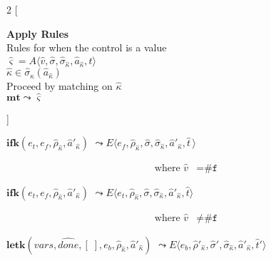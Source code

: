 \documentclass[12pt,draft]{article}
\newcommand{\falsesyn}{\texttt{\#f}}
\begin{document}
\begin{multicols*}{2}
[
\begin{center}
\textbf{Apply Rules} \\
Rules for when the control is a value \\
$\hat{\varsigma} = A\langle \hat{v} , \hat{\sigma} , \hat{\sigma}_{\hat{\kappa}} , \hat{a}_{\hat{\kappa}} , \hat{t} \rangle$ \\
$\hat{\kappa} \in \hat{\sigma}_{\hat{\kappa}}(\hat{a}_{\hat{\kappa}})$ \\
Proceed by matching on $\hat{\kappa}$ \\
\vspace{5mm}
$\textbf{mt} \leadsto \hat{\varsigma}$
\end{center}
\vspace{-5mm}
]
\begin{center}
  $\textbf{ifk}(e_t, e_f, \hat{\rho}_{\hat{\kappa}}, \hat{a}'_{\hat{\kappa}})$
  $\leadsto E\langle e_f , \hat{\rho}_{\hat{\kappa}} , \hat{\sigma} , \hat{\sigma}_{\hat{\kappa}} , \hat{a}'_{\hat{\kappa}} , \hat{t}\,\rangle$
\end{center}
\vspace{-7mm}
\begin{align*}
\text{where } \hat{v} &= \falsesyn
\end{align*}
\begin{center}
  $\textbf{ifk}(e_t, e_f, \hat{\rho}_{\hat{\kappa}}, \hat{a}'_{\hat{\kappa}})$
  $\leadsto E\langle e_t , \hat{\rho}_{\hat{\kappa}}, \hat{\sigma} , \hat{\sigma}_{\hat{\kappa}} , \hat{a}'_{\hat{\kappa}} , \hat{t} \rangle$
\end{center}
\vspace{-7mm}
\begin{align*}
\text{where } \hat{v} &\not= \falsesyn
\end{align*}
\begin{center}
  $\textbf{letk}(vars, \widehat{done}, [\;], e_b, \hat{\rho}_{\hat{\kappa}} , \hat{a}'_{\hat{\kappa}})$
  $\leadsto E\langle e_b , \hat{\rho}'_{\hat{\kappa}} , \hat{\sigma}' , \hat{\sigma}_{\hat{\kappa}} , \hat{a}'_{\hat{\kappa}} , \hat{t}'\rangle $
\end{center}
\vspace{-7mm}
\begin{align*}

\end{align*}
\end{multicols*}
\end{document}
